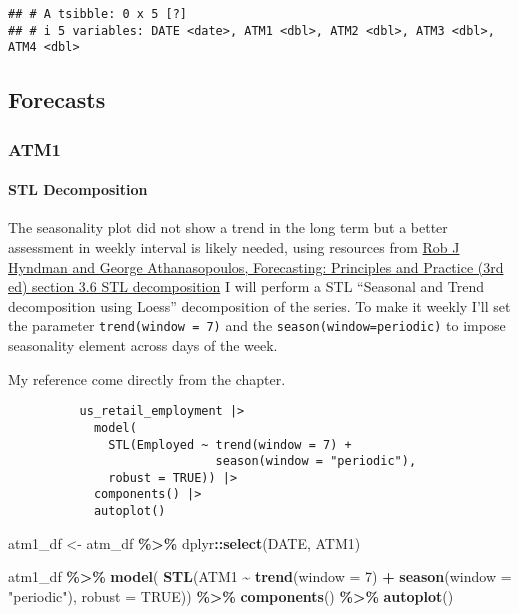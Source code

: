 \documentclass[
]{article}
\newenvironment{Shaded}{\begin{snugshade}}{\end{snugshade}}
\newcommand{\AttributeTok}[1]{\textcolor[rgb]{0.13,0.29,0.53}{#1}}
\newcommand{\ConstantTok}[1]{\textcolor[rgb]{0.56,0.35,0.01}{#1}}
\newcommand{\DecValTok}[1]{\textcolor[rgb]{0.00,0.00,0.81}{#1}}
\newcommand{\FunctionTok}[1]{\textcolor[rgb]{0.13,0.29,0.53}{\textbf{#1}}}
\newcommand{\NormalTok}[1]{#1}
\newcommand{\OtherTok}[1]{\textcolor[rgb]{0.56,0.35,0.01}{#1}}
\newcommand{\SpecialCharTok}[1]{\textcolor[rgb]{0.81,0.36,0.00}{\textbf{#1}}}
\newcommand{\StringTok}[1]{\textcolor[rgb]{0.31,0.60,0.02}{#1}}
\begin{document}
\begin{verbatim}
## # A tsibble: 0 x 5 [?]
## # i 5 variables: DATE <date>, ATM1 <dbl>, ATM2 <dbl>, ATM3 <dbl>, ATM4 <dbl>
\end{verbatim}

\hypertarget{forecasts}{%
\subsection{Forecasts}\label{forecasts}}

\hypertarget{atm1}{%
\subsubsection{ATM1}\label{atm1}}

\hypertarget{stl-decomposition}{%
\paragraph{STL Decomposition}\label{stl-decomposition}}

The seasonality plot did not show a trend in the long term but a better
assessment in weekly interval is likely needed, using resources from
\href{https://otexts.com/fpp3/stl.html}{Rob J Hyndman and George
Athanasopoulos, Forecasting: Principles and Practice (3rd ed) section
3.6 STL decomposition} I will perform a STL ``Seasonal and Trend
decomposition using Loess'' decomposition of the series. To make it
weekly I'll set the parameter \texttt{trend(window\ =\ 7)} and the
\texttt{season(window=\textquotesingle{}periodic\textquotesingle{})} to
impose seasonality element across days of the week.

My reference come directly from the chapter.

\begin{verbatim}
          us_retail_employment |>
            model(
              STL(Employed ~ trend(window = 7) +
                             season(window = "periodic"),
              robust = TRUE)) |>
            components() |>
            autoplot()
\end{verbatim}

\begin{Shaded}
\begin{Highlighting}[]
\NormalTok{atm1\_df }\OtherTok{\textless{}{-}}\NormalTok{ atm\_df }\SpecialCharTok{\%\textgreater{}\%} 
\NormalTok{  dplyr}\SpecialCharTok{::}\FunctionTok{select}\NormalTok{(DATE, ATM1)}

\NormalTok{atm1\_df }\SpecialCharTok{\%\textgreater{}\%}
  \FunctionTok{model}\NormalTok{(}
    \FunctionTok{STL}\NormalTok{(ATM1 }\SpecialCharTok{\textasciitilde{}} \FunctionTok{trend}\NormalTok{(}\AttributeTok{window =} \DecValTok{7}\NormalTok{) }\SpecialCharTok{+}
                   \FunctionTok{season}\NormalTok{(}\AttributeTok{window =} \StringTok{"periodic"}\NormalTok{),}
    \AttributeTok{robust =} \ConstantTok{TRUE}\NormalTok{)) }\SpecialCharTok{\%\textgreater{}\%}
  \FunctionTok{components}\NormalTok{() }\SpecialCharTok{\%\textgreater{}\%}
  \FunctionTok{autoplot}\NormalTok{()}
\end{Highlighting}
\end{Shaded}
\end{document}
